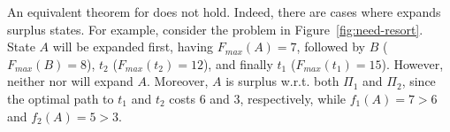 An equivalent theorem for \kastarmax does not hold.
Indeed, there are cases where \kastarmax expands surplus states.
For example, consider the \kgs problem in Figure~\ref{fig:need-resort}.
State $A$ will be expanded first, having $F_{max}(A) = 7$, followed by $B$ ($F_{max}(B) = 8$), $t_2$ ($F_{max}(t_2) = 12$), and finally $t_1$ ($F_{max}(t_1) = 15$).
However, neither  nor  will expand $A$.
Moreover, $A$ is surplus w.r.t. both $\Pi_1$ and $\Pi_2$, since the optimal path to $t_1$ and $t_2$ costs 6 and 3, respectively, while $f_1(A) = 7 > 6$ and $f_2(A) = 5 > 3$.


